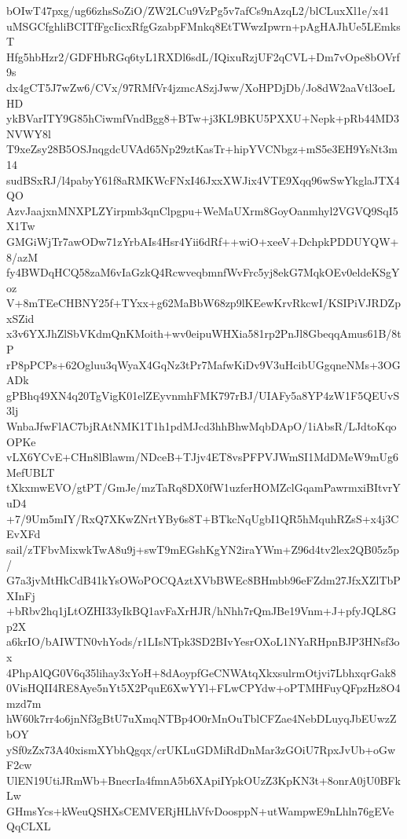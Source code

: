 bOIwT47pxg/ug66zhsSoZiO/ZW2LCu9VzPg5v7afCs9nAzqL2/blCLuxXl1e/x41
uMSGCfghliBCITfFgcIicxRfgGzabpFMnkq8EtTWwzIpwrn+pAgHAJhUe5LEmksT
Hfg5hbHzr2/GDFHbRGq6tyL1RXDl6sdL/IQixuRzjUF2qCVL+Dm7vOpe8bOVrf9s
dx4gCT5J7wZw6/CVx/97RMfVr4jzmcASzjJww/XoHPDjDb/Jo8dW2aaVtl3oeLHD
ykBVarITY9G85hCiwmfVndBgg8+BTw+j3KL9BKU5PXXU+Nepk+pRb44MD3NVWY8l
T9xeZsy28B5OSJnqgdcUVAd65Np29ztKasTr+hipYVCNbgz+mS5e3EH9YsNt3m14
sudBSxRJ/l4pabyY61f8aRMKWcFNxI46JxxXWJix4VTE9Xqq96wSwYkglaJTX4QO
AzvJaajxnMNXPLZYirpmb3qnClpgpu+WeMaUXrm8GoyOanmhyl2VGVQ9SqI5X1Tw
GMGiWjTr7awODw71zYrbAIs4Hsr4Yii6dRf++wiO+xeeV+DchpkPDDUYQW+8/azM
fy4BWDqHCQ58zaM6vIaGzkQ4RcwveqbmnfWvFrc5yj8ekG7MqkOEv0eldeKSgYoz
V+8mTEeCHBNY25f+TYxx+g62MaBbW68zp9lKEewKrvRkcwI/KSIPiVJRDZpxSZid
x3v6YXJhZlSbVKdmQnKMoith+wv0eipuWHXia581rp2PnJl8GbeqqAmus61B/8tP
rP8pPCPs+62Ogluu3qWyaX4GqNz3tPr7MafwKiDv9V3uHcibUGgqneNMs+3OGADk
gPBhq49XN4q20TgVigK01elZEyvnmhFMK797rBJ/UIAFy5a8YP4zW1F5QEUvS3lj
WnbaJfwFlAC7bjRAtNMK1T1h1pdMJcd3hhBhwMqbDApO/1iAbsR/LJdtoKqoOPKe
vLX6YCvE+CHn8lBlawm/NDceB+TJjv4ET8vsPFPVJWmSI1MdDMeW9mUg6MefUBLT
tXkxmwEVO/gtPT/GmJe/mzTaRq8DX0fW1uzferHOMZclGqamPawrmxiBItvrYuD4
+7/9Um5mIY/RxQ7XKwZNrtYBy6s8T+BTkcNqUgbI1QR5hMquhRZsS+x4j3CEvXFd
sail/zTFbvMixwkTwA8u9j+swT9mEGshKgYN2iraYWm+Z96d4tv2lex2QB05z5p/
G7a3jvMtHkCdB41kYsOWoPOCQAztXVbBWEc8BHmbb96eFZdm27JfxXZlTbPXInFj
+bRbv2hq1jLtOZHI33yIkBQ1avFaXrHJR/hNhh7rQmJBe19Vnm+J+pfyJQL8Gp2X
a6krIO/bAIWTN0vhYods/r1LIsNTpk3SD2BIvYesrOXoL1NYaRHpnBJP3HNsf3ox
4PhpAlQG0V6q35lihay3xYoH+8dAoypfGeCNWAtqXkxsulrmOtjvi7LbhxqrGak8
0VisHQII4RE8Aye5nYt5X2PquE6XwYYl+FLwCPYdw+oPTMHFuyQFpzHz8O4mzd7m
hW60k7rr4o6jnNf3gBtU7uXmqNTBp4O0rMnOuTblCFZae4NebDLuyqJbEUwzZbOY
ySf0zZx73A40xismXYbhQgqx/crUKLuGDMiRdDnMar3zGOiU7RpxJvUb+oGwF2cw
UlEN19UtiJRmWb+BnecrIa4fmnA5b6XApiIYpkOUzZ3KpKN3t+8onrA0jU0BFkLw
GHmsYcs+kWeuQSHXsCEMVERjHLhVfvDoosppN+utWampwE9nLhln76gEVeQqCLXL
